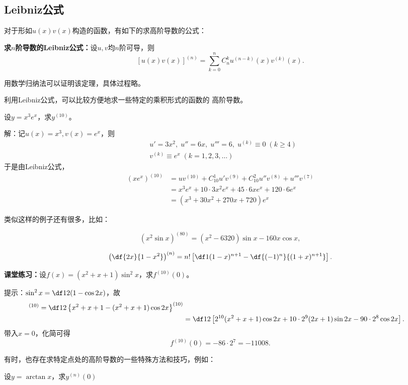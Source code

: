 \subsection{Leibniz公式}

对于形如$u(x)v(x)$构造的函数，有如下的求高阶导数的公式：

\begin{thx}
	{\bf 求$n$阶导数的Leibniz公式：}设$u,v$均$n$阶可导，则
	$$\left[u(x)v(x)\right]^{(n)}=
	\sum\limits_{k=0}^nC_n^ku^{(n-k)}(x)v^{(k)}(x).$$
\end{thx}

用数学归纳法可以证明该定理，具体过程略。

利用Leibniz公式，可以比较方便地求一些特定的乘积形式的函数的
高阶导数。

\bs
\egz 设$y=x^3e^x$，求$y^{(10)}$。

解：记$u(x)=x^3,v(x)=e^x$，则
\begin{align*}
	& u'=3x^2, \; u''=6x, \; u'''=6, \; u^{(k)}\equiv 0\;(k\geq 4)\\
	& v^{(k)}\equiv e^x\;(k=1,2,3,\ldots)
\end{align*}
于是由Leibniz公式，
\begin{align*}
	(xe^x)^{(10)}
	&=uv^{(10)}+C_{10}^1u'v^{(9)}+C_{10}^2u''v^{(8)}+u'''v^{(7)}\\
	&=x^3e^x+10\cdot 3x^2e^x+45\cdot 6xe^x+120\cdot 6e^x\\
	&=(x^3+30x^2+270x+720)e^x
\end{align*}
\fin

类似这样的例子还有很多，比如：

$$(x^2\sin x)^{(80)}=(x^2-6320)\sin x-160x\cos x,$$

$$\left(\df{2x}{1-x^2}\right)^{(n)}=n!\left[\df1{(1-x)^{n+1}}
-\df{(-1)^n}{(1+x)^{n+1}}\right].$$

{\bf 课堂练习：}设$f(x)=(x^2+x+1)\sin^2 x$，求$f^{(10)}(0)$。

\ifhint
提示：$\sin^2x=\df12(1-\cos 2x)$，故
\begin{align*}
	[(x^2&+x+1)\sin^2x]^{(10)}	
	=\df12\left\{x^2+x+1-(x^2+x+1)\cos2x\right\}^{(10)}\\
	&=\df12\left[2^{10}(x^2+x+1)\cos 2x
	+10\cdot2^9(2x+1)\sin2x
	-90\cdot2^8\cos2x\right].
\end{align*}
带入$x=0$，化简可得
$$f^{(10)}(0)=-86\cdot2^7=-11008.$$
\fi

\bs
有时，也存在求特定点处的高阶导数的一些特殊方法和技巧，例如：

\egz 设$y=\arctan x$，求$y^{(n)}(0)$

